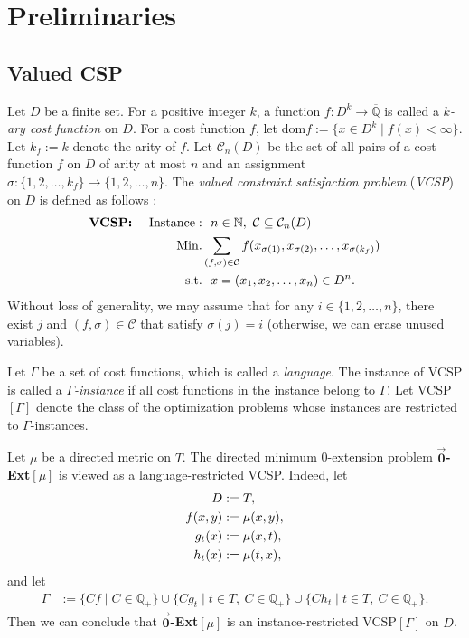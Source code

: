 \documentclass[11pt]{article}
\theoremstyle{definition}
\begin{document}
\section{Preliminaries}
\label{sec:preliminaries}
\subsection{Valued CSP}
Let $D$ be a finite set. For a positive integer $k$, a function $f:D^k \rightarrow \overline{\mathbb{Q}}$ is called a $k$\textit{-ary cost function} on $D$. For a cost function $f$, let $\mathrm{dom}f := \{x\in D^k\mid f(x)<\infty \}$. Let $k_f:=k$ denote the arity of $f$. Let $\mathcal{C}_n(D)$ be the set of all pairs of a cost function $f$ on $D$ of arity at most $n$ and an assignment $\sigma:\{1,2,\ldots,k_f\}\rightarrow \{1,2,\ldots,n\}$. The \textit{valued constraint satisfaction problem} (\textit{VCSP}) on $D$ is defined as follows \cite{zivny2012}:
\begin{align*}
\textbf{VCSP:}\mathrm{\ \ \ \ } \mathrm{Instance}:&\mathrm{\ \ }n\in \mathbb{N},\mathrm{\ }\mathcal{C} \subseteq \mathcal{C}_n(D)\\
\mathrm{Min.}&\displaystyle\sum_{\tiny (f,\sigma)\in
\mathcal{C}\normalsize}f(x_{\sigma(1)},x_{\sigma(2)},\ldots,x_{\sigma(k_f)})\\ \mathrm{s.t.}&\mathrm{\ \ }x=(x_1,x_2,\ldots,x_n)\in D^n.
\end{align*}
Without loss of generality, we may assume that for any $i\in \{1,2,\ldots,n\}$, there exist $j$ and $(f,\sigma)\in \mathcal{C}$ that satisfy $\sigma(j)=i$ 
(otherwise, we can erase unused variables). 

Let $\Gamma$ be a set of cost functions, which is called a \textit{language}. 
The instance of VCSP is called a $\Gamma$\textit{-instance} if all cost functions in the instance belong to $\Gamma$. 
Let VCSP$[\Gamma]$ denote the class of the optimization problems whose instances are restricted to $\Gamma$-instances.

Let $\mu$ be a directed metric on $T$. The directed minimum 0-extension problem $\overrightarrow{\textbf{0}}$\textbf{-Ext}$[\mu]$ is viewed as a language-restricted VCSP. Indeed, let
\begin{align}
    D&:=T,\notag\\
    f(x,y)&:=\mu(x,y),\notag\\
    g_t(x)&:=\mu(x,t),\notag\\ 
    h_t(x)&:=\mu(t,x), \notag
\end{align}
and let
\begin{align}
\label{0-ext-->vcsp}
    \Gamma&:=\{Cf\mid C\in \mathbb{Q}_{+}\}\cup\{Cg_t\mid t\in T,\ C\in \mathbb{Q}_{+}\}\cup\{Ch_t\mid t\in T,\ C\in \mathbb{Q}_{+}\}.
\end{align}
Then we can conclude that $\overrightarrow{\textbf{0}}$\textbf{-Ext}$[\mu]$ is an instance-restricted VCSP$[\Gamma]$ on $D$.
\end{document}

